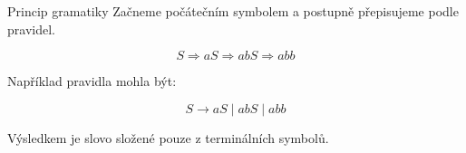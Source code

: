 \documentclass[11pt,professionalfont,aspectratio=3] {beamer}
\begin{document}
    \begin{frame}{Princip gramatiky}
        Začneme počátečním symbolem a postupně přepisujeme podle pravidel.

        \[
            S \Rightarrow aS \Rightarrow abS \Rightarrow abb
        \]

        \pause

        Například pravidla mohla být:

        \[
            S \to aS \mid abS \mid abb
        \]

        \pause

        Výsledkem je slovo složené pouze z terminálních symbolů.
    \end{frame}
\end{document}
